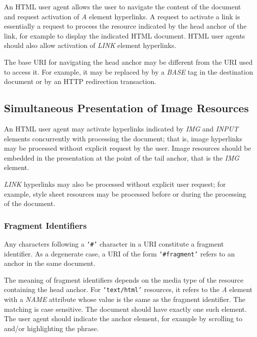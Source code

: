 An HTML user agent allows the user to navigate the content of the
document and request activation of {\it A} element hyperlinks.  A
request to activate a link is essentially a request to process the
resource indicated by the head anchor of the link, for example to
display the indicated HTML document.  HTML user agents should also
allow activation of {\it LINK} element hyperlinks.
\par \par 
The base URI for navigating the head anchor may be different from
the URI used to access it.  For example, it may be replaced by by a
{\it BASE} tag in the destination document or by an HTTP redirection
transaction.
\par \subsection*{Simultaneous Presentation of Image Resources}\par 
An HTML user agent may activate hyperlinks indicated by {\it IMG} and
{\it INPUT} elements concurrently with processing the document;  that
is, image hyperlinks may be processed without explicit request by the
user.  Image resources should be embedded in the presentation at the
point of the tail anchor, that is the {\it IMG} element.
\par \par {\it LINK} hyperlinks may also be processed without explicit user
request;  for example, style sheet resources may be processed before or
during the processing of the document.
\par \subsubsection*{Fragment Identifiers}\par 
Any characters following a {\tt `\#'} character in a URI constitute a
fragment identifier.  As a degenerate case, a URI of the form
{\tt `\#fragment'} refers to an anchor in the same document.
\par \par 
The meaning of fragment identifiers depends on the media type of the
resource containing the head anchor.  For {\tt `text/html'} resources,
it refers to the {\it A} element with a {\it NAME} attribute whose
value is the same as the fragment identifier.  The matching is case
sensitive.  The document should have exactly one such element.  The user
agent should indicate the anchor element, for example by scrolling to
and/or highlighting the phrase.

